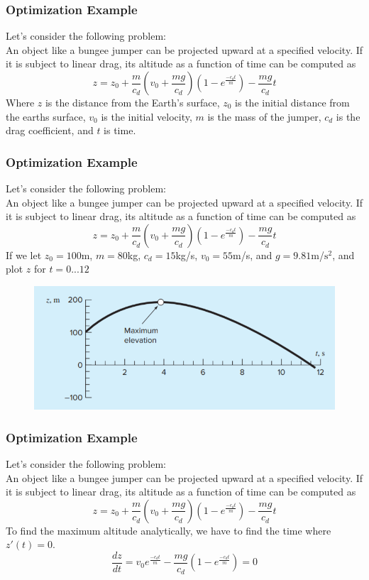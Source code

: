 \documentclass{if-beamer}
\begin{document}
\begin{frame}
		\frametitle{Optimization Example}
Let's consider the following problem: \\\vspace{8pt}
An object like a bungee jumper can be projected upward at a specified velocity. If it is subject to linear drag, its altitude as a function of time can be computed as
$$ z = z_0 +\frac{m}{c_d}\left(v_0+\frac{mg}{c_d}\right)\left(1-e^{\frac{-c_dt}{m}}\right) -\frac{mg}{c_d}t $$
Where $z$ is the distance from the Earth's surface, $z_0$ is the initial distance from the earths surface, $v_0$ is the initial velocity, $m$ is the mass of the jumper, $c_d$ is the drag coefficient, and $t$ is time. 
\end{frame}

\begin{frame}
	\frametitle{Optimization Example}
	Let's consider the following problem: \\\vspace{8pt}
	An object like a bungee jumper can be projected upward at a specified velocity. If it is subject to linear drag, its altitude as a function of time can be computed as
	$$ z = z_0 +\frac{m}{c_d}\left(v_0+\frac{mg}{c_d}\right)\left(1-e^{\frac{-c_dt}{m}}\right) -\frac{mg}{c_d}t $$
	If we let $z_0 = 100$m, $m = 80$kg, $c_d = 15$kg/s, $v_0 = 55$m/s, and $g = 9.81$m/$\textrm{s}^2$, and plot $z$ for $t = 0...12$
	\begin{figure}
		\centering
		\includegraphics[width=.8\textwidth]{figures/graphex}
	\end{figure}
\end{frame}

\begin{frame}
	\frametitle{Optimization Example}
	Let's consider the following problem: \\\vspace{8pt}
	An object like a bungee jumper can be projected upward at a specified velocity. If it is subject to linear drag, its altitude as a function of time can be computed as
	$$ z = z_0 +\frac{m}{c_d}\left(v_0+\frac{mg}{c_d}\right)\left(1-e^{\frac{-c_dt}{m}}\right) -\frac{mg}{c_d}t $$
	To find the maximum altitude analytically, we have to find the time where $z'(t) = 0$.
	$$\frac{dz}{dt} = v_0e^{\frac{-c_dt}{m}} - \frac{mg}{c_d}\left( 1-e^{\frac{-c_dt}{m}} \right)=0$$
\end{frame}
\end{document}
